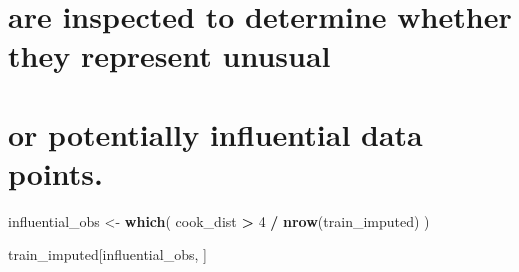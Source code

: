 \documentclass[
]{article}
\newenvironment{Shaded}{\begin{snugshade}}{\end{snugshade}}
\newcommand{\DecValTok}[1]{\textcolor[rgb]{0.00,0.00,0.81}{#1}}
\newcommand{\FunctionTok}[1]{\textcolor[rgb]{0.13,0.29,0.53}{\textbf{#1}}}
\newcommand{\NormalTok}[1]{#1}
\newcommand{\OtherTok}[1]{\textcolor[rgb]{0.56,0.35,0.01}{#1}}
\newcommand{\SpecialCharTok}[1]{\textcolor[rgb]{0.81,0.36,0.00}{\textbf{#1}}}
\begin{document}
\section{are inspected to determine whether they represent
unusual}\label{are-inspected-to-determine-whether-they-represent-unusual}

\section{or potentially influential data
points.}\label{or-potentially-influential-data-points.}

\begin{Shaded}
\begin{Highlighting}[]
\NormalTok{influential\_obs }\OtherTok{\textless{}{-}} \FunctionTok{which}\NormalTok{(}
\NormalTok{  cook\_dist }\SpecialCharTok{\textgreater{}} \DecValTok{4} \SpecialCharTok{/} \FunctionTok{nrow}\NormalTok{(train\_imputed)}
\NormalTok{)}

\NormalTok{train\_imputed[influential\_obs, ]}
\end{Highlighting}
\end{Shaded}
\end{document}
